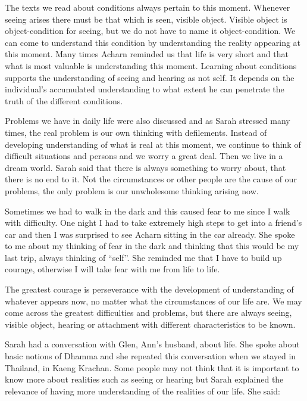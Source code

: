 The texts we read about conditions always pertain to this moment.
Whenever seeing arises there must be that which is seen, visible object.
Visible object is object-condition for seeing, but we do not have to
name it object-condition. We can come to understand this condition by
understanding the reality appearing at this moment. Many times Acharn
reminded us that life is very short and that what is most valuable is
understanding this moment. Learning about conditions supports the
understanding of seeing and hearing as not self. It depends on the
individual's accumulated understanding to what extent he can penetrate
the truth of the different conditions.

Problems we have in daily life were also discussed and as Sarah stressed
many times, the real problem is our own thinking with defilements.
Instead of developing understanding of what is real at this moment, we
continue to think of difficult situations and persons and we worry a
great deal. Then we live in a dream world. Sarah said that there is
always something to worry about, that there is no end to it. Not the
circumstances or other people are the cause of our problems, the only
problem is our unwholesome thinking arising now.

Sometimes we had to walk in the dark and this caused fear to me since I
walk with difficulty. One night I had to take extremely high steps to
get into a friend's car and then I was surprised to see Acharn sitting
in the car already. She spoke to me about my thinking of fear in the
dark and thinking that this would be my last trip, always thinking of
``self''. She reminded me that I have to build up courage, otherwise I
will take fear with me from life to life.

The greatest courage is perseverance with the development of
understanding of whatever appears now, no matter what the circumstances
of our life are. We may come across the greatest difficulties and
problems, but there are always seeing, visible object, hearing or
attachment with different characteristics to be known.

Sarah had a conversation with Glen, Ann's husband, about life. She spoke
about basic notions of Dhamma and she repeated this conversation when we
stayed in Thailand, in Kaeng Krachan. Some people may not think that it
is important to know more about realities such as seeing or hearing but
Sarah explained the relevance of having more understanding of the
realities of our life. She said:

